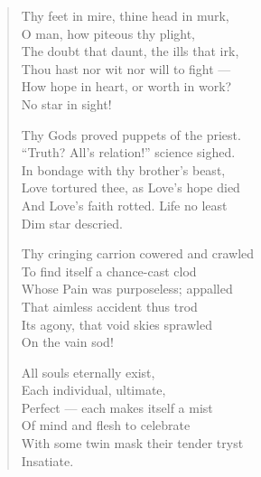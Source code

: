 
\begin{verse}
  Thy feet in mire, thine head in murk, \\
  \hspace{1em} O man, how piteous thy plight, \\
  The doubt that daunt, the ills that irk, \\
  \hspace{1em} Thou  hast nor wit nor will to fight --- \\
  How hope in heart, or worth in work? \\
  \hspace{1em} No star in sight!  

  Thy Gods proved puppets of the priest. \\
  \hspace{1em} \enquote{Truth? All's relation!} science sighed. \\
  In bondage with thy brother's beast, \\
  \hspace{1em} Love tortured thee, as Love's hope died \\
  And Love's faith rotted. Life no least \\
  \hspace{1em} Dim star descried. 

  Thy cringing carrion cowered and crawled \\
  \hspace{1em}To find itself a chance-cast clod \\
  Whose Pain was purposeless; appalled \\
  \hspace{1em}That aimless accident thus trod \\
  Its agony, that void skies sprawled \\
  \hspace{1em}On the vain sod! 

  All souls eternally exist, \\
  \hspace{1em}Each individual, ultimate, \\
  Perfect --- each makes itself a mist \\
  \hspace{1em}Of mind and flesh to celebrate \\
  With some twin mask their tender tryst \\
  \hspace{1em}Insatiate. 


\end{verse}
